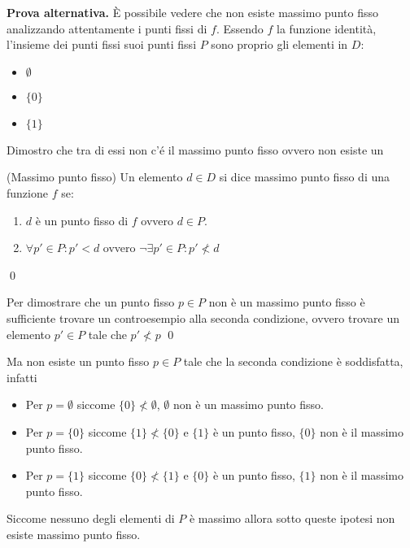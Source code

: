 \textbf{Prova alternativa.} È possibile vedere che non esiste massimo
punto fisso analizzando attentamente i punti fissi di $f$. Essendo $f$ la
funzione identità, l'insieme dei punti fissi suoi punti fissi $P$ sono proprio gli elementi in $D$:
\begin{itemize}
  \item $\emptyset$
  \item $\{0\}$
  \item $\{1\}$
\end{itemize}
Dimostro che tra di essi non c'é il massimo punto fisso ovvero non esiste un 
\begin{mydef}(Massimo punto fisso)
Un elemento $d \in D$ si dice massimo punto fisso di una funzione $f$ se:
\begin{enumerate}
	\item $d$ è un punto fisso di $f$ ovvero $d \in P$.
	\item $\forall p' \in P: p' \lt d$ ovvero $\neg \exists p' \in P : p' \not \lt d$
\end{enumerate}
\qed
\end{mydef}
\begin{Oss}
	Per dimostrare che un punto fisso $p \in P$ non è un massimo punto fisso è sufficiente trovare un controesempio alla 
	seconda condizione, ovvero trovare un elemento $p' \in P$ tale che $p' \not \lt p$
\qed
\end{Oss}

Ma non esiste un punto fisso $p \in P$ tale che la seconda condizione è soddisfatta, infatti
\begin{itemize}
	\item Per $\boxed{p = \emptyset}$ siccome $\{0\} \not \lt \emptyset$, $\emptyset$ non è un massimo punto fisso.
	\item Per $\boxed{p = \{0\}}$ siccome $\{1\} \not \lt \{0\}$ e $\{1\}$ è un punto fisso, $\{0\}$ non è il massimo punto fisso.
	\item Per $\boxed{p = \{1\}}$ siccome $\{0\} \not \lt \{1\}$ e $\{0\}$ è un punto fisso, $\{1\}$ non è il massimo punto fisso.
\end{itemize}
Siccome nessuno degli elementi di $P$ è massimo allora sotto queste ipotesi non esiste massimo punto fisso.
\cvd
